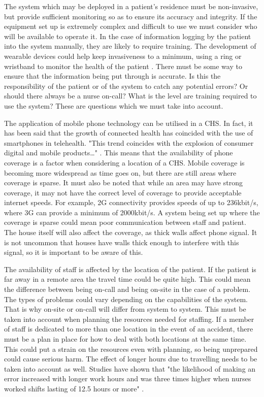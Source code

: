 The system which may be deployed in a patient's residence must be non-invasive, but provide sufficient monitoring so as to ensure its accuracy and integrity. If the equipment set up is extremely complex and difficult to use we must consider who will be available to operate it. In the case of information logging by the patient into the system manually, they are likely to require training. The development of wearable devices could help keep invasiveness to a minimum, using a ring or wristband to monitor the health of the patient \parencite{home}. There must be some way to ensure that the information being put through is accurate. Is this the responsibility of the patient or of the system to catch any potential errors? Or should there always be a nurse on-call? What is the level are training required to use the system? These are questions which we must take into account.

The application of mobile phone technology can be utilised in a CHS. In fact, it has been said that the growth of connected health has coincided with the use of smartphones in telehealth. "This trend coincides with the explosion of consumer digital and mobile products…" \parencite{landers}. This means that the availability of phone coverage is a factor when considering a location of a CHS. Mobile coverage is becoming more widespread as time goes on, but there are still areas where coverage is sparse. It must also be noted that while an area may have strong coverage, it may not have the correct level of coverage to provide acceptable internet speeds. For example, 2G connectivity provides speeds of up to 236kbit/s, where 3G can provide a minimum of 2000kbit/s. A system being set up where the coverage is sparse could mean poor communication between staff and patient. The house itself will also affect the coverage, as thick walls affect phone signal. It is not uncommon that houses have walls thick enough to interfere with this signal, so it is important to be aware of this.

The availability of staff is affected by the location of the patient. If the patient is far away in a remote area the travel time could be quite high. This could mean the difference between being on-call and being on-site in the case of a problem. The types of problems could vary depending on the capabilities of the system. That is why on-site or on-call will differ from system to system. This must be taken into account when planning the resources needed for staffing. If a member of staff is dedicated to more than one location in the event of an accident, there must be a plan in place for how to deal with both locations at the same time. This could put a strain on the resources even with planning, so being unprepared could cause serious harm. The effect of longer hours due to travelling needs to be taken into account as well. Studies have shown that "the likelihood of making an error increased with longer work hours and was three times higher when nurses worked shifts lasting of 12.5 hours or more" \parencite{nursesworking}.

